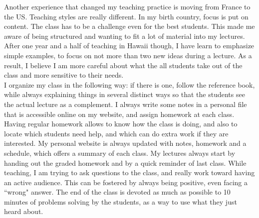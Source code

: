 \documentclass[a4paper]{article}
\begin{document}
Another experience that changed my teaching practice is moving from France to the US. Teaching styles are really different. In my birth country, focus is put on content. The class has to be a challenge even for the best students. This made me aware of being structured and wanting to fit a lot of material into my lectures. After one year and a half of teaching in Hawaii though, I have learn to emphasize simple examples, to focus on not more than two new ideas during a lecture. As a result, I believe I am more careful about what the all students take out of the class and more sensitive to their needs.\\    

I organize my class in the following way: if there is one, follow the reference book, while always explaining things in several distinct ways so that the students see the actual lecture as a complement. I always write some notes in a personal file that is accessible online on my website, and assign homework at each class. Having regular homework allows to know how the class is doing, and also to locate which students need help, and which can do extra work if they are interested. My personal website is always updated with notes, homework and a schedule, which offers a summary of each class. My lectures always start by handing out the graded homework and by a quick reminder of last class. While teaching, I am trying to ask questions to the class, and really work toward having an active audience. This can be fostered by always being positive, even facing a ``wrong" answer. The end of the class is devoted as much as possible to 10 minutes of problems solving by the students, as a way to use what they just heard about.\\
   
\end{document}
